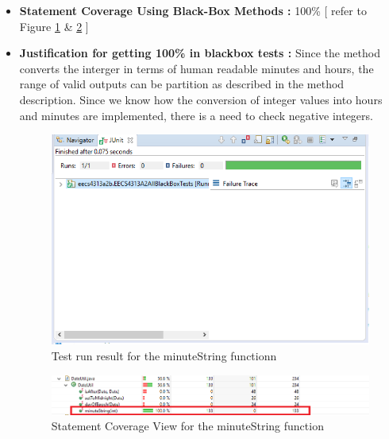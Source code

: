 \documentclass[fontsize=12pt,paper=letter,twoside]{scrartcl}
\begin{document}
\begin{itemize}
\item \textbf {Statement Coverage Using Black-Box Methods :}
100\% [ refer to Figure \ref{fig:bbt_ect_pass} \& \ref{fig:wbt_ect_code} ] 
\item \textbf {Justification for getting 100\% in blackbox tests :} Since the method converts the interger in terms of human readable minutes and hours, the range of valid outputs can be partition as described in the method description. Since we know how the conversion of integer values into hours and minutes are implemented, there is a need to check negative integers.
\begin{figure}[!htb]
\begin{center}
\includegraphics[width=.99\textwidth]{images/wbt/ect/bbt_ect.png}
\end{center}
\caption{Test run result for the minuteString functionn}
\label{fig:bbt_ect_pass}
\end{figure}

\begin{figure}[!htb]
\begin{center}
\includegraphics[width=.90\textwidth]{images/wbt/ect/statement_coverage.png}
\end{center}
\caption{Statement Coverage View for the minuteString function}
\label{fig:wbt_ect_code}
\end{figure}


\end{itemize}
\end{document}
